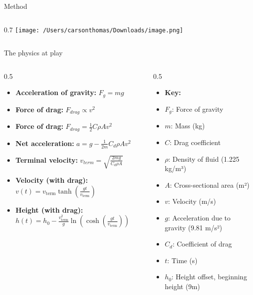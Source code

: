 \documentclass[final]{beamer}
\newlength{\colwidth}
\begin{document}
\begin{frame}[t]
\begin{columns}[t]
\begin{column}{\colwidth}
\begin{block}{Method}
\begin{columns}[t]
\begin{column}{0.7\colwidth}
            \texttt{[image: /Users/carsonthomas/Downloads/image.png]} %

\end{column}
\end{columns}
  \end{block}
\begin{alertblock}{The physics at play}
\begin{columns}[t]
\hspace{20pt} %
\begin{column}{0.5\colwidth}
\begin{itemize}
\setlength{\itemsep}{2mm}
\item
\textbf{Acceleration of gravity: } $F_g = mg$
\item
\textbf{Force of drag: } $ F_{drag} \propto v^2$ 
\item
\textbf{Force of drag: } $ F_{drag} = \frac{1}{2} C \rho Av^2$ 
\item
\textbf{Net acceleration: } $ a = g - \frac{1}{2m} C_d \rho A v^2$ 
\item
\textbf{Terminal velocity: } $ v_{term} = \sqrt{\frac{2mg}{C_d \rho A}}$ 
\item
\textbf{Velocity (with drag): } $ v(t) = v_{\text{term}} \tanh \left( \frac{gt}{v_{\text{term}}} \right)$
\item
\textbf{Height (with drag): } $ h(t) = h_0 - \frac{v_{\text{term}}^2}{g} \ln \left(\cosh \left( \frac{gt}{v_{\text{term}}}\right) \right)$
\end{itemize}
\end{column}
\hspace{10pt} %
\begin{column}{0.5\colwidth}
\vspace{-13.2pt} %
\begin{itemize}
\setlength{\itemsep}{2mm}
\item
\textbf{Key:}
\item $F_g$: Force of gravity
\item $m$: Mass (kg)
\item $C$: Drag coefficient
\item $\rho$: Density of fluid (1.225 kg/m³)
\item $A$: Cross-sectional area (m²)
\item $v$: Velocity (m/s)
\item $g$: Acceleration due to gravity (9.81 m/s²)
\item $C_d$: Coefficient of drag
\item $t$: Time (s)
\item $h_0$: Height offset, beginning height (9m)
\end{itemize}
\end{column}
\end{columns}


\end{alertblock}
\end{column}
\end{columns}
\end{frame}
\end{document}
